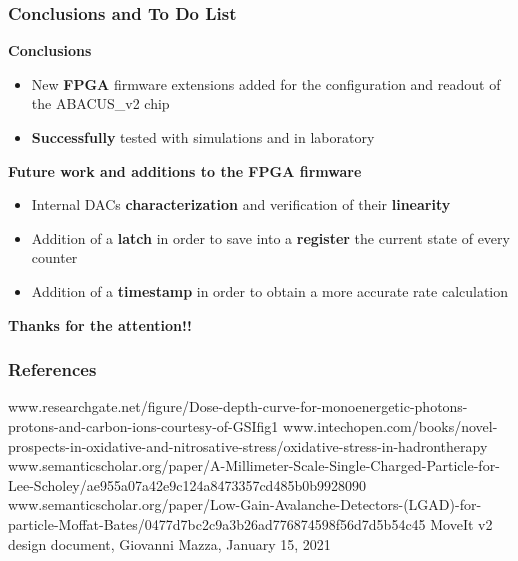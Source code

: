 \documentclass[aspectratio=169]{beamer}
\begin{document}
	\begin{frame}
	\frametitle{Conclusions and To Do List}
	\begin{center}
		{\color{blue}\textbf{Conclusions}}
	\end{center}
		\begin{itemize}
			\item New \textbf{FPGA} firmware extensions added for the configuration and readout of the ABACUS\_v2 chip
			\item \textbf{Successfully} tested with simulations and in laboratory
		\end{itemize}
	
	\begin{center}
		{\color{blue}\textbf{Future work and additions to the FPGA firmware}}
	\end{center}
		\begin{itemize}
			\item Internal DACs \textbf{characterization} and verification of their \textbf{linearity}
			\item Addition of a \textbf{latch} in order to save into a \textbf{register} the current state of every counter 
			\item Addition of a \textbf{timestamp} in order to obtain a more accurate rate calculation 
		\end{itemize}
			\vspace{1 cm}
		\begin{center}
			\textbf{Thanks for the attention!!}
		\end{center}	
	\end{frame}

	\begin{frame}[noframenumbering]
	\frametitle{References}
	{\scriptsize 
	\begin{thebibliography}{00}
		www.researchgate.net/figure/Dose-depth-curve-for-monoenergetic-photons-protons-and-carbon-ions-courtesy-of-GSI\textunderscore fig1\textunderscore283521369
		\newline
		www.intechopen.com/books/novel-prospects-in-oxidative-and-nitrosative-stress/oxidative-stress-in-hadrontherapy
		\newline
		www.semanticscholar.org/paper/A-Millimeter-Scale-Single-Charged-Particle-for-Lee-Scholey/ae955a07a42e9c124a8473357cd485b0b9928090
		\newline
		www.semanticscholar.org/paper/Low-Gain-Avalanche-Detectors-(LGAD)-for-particle-Moffat-Bates/0477d7bc2c9a3b26ad776874598f56d7d5b54c45
		\newline
		MoveIt v2 design document, Giovanni Mazza, January 15, 2021
	\end{thebibliography} }
	\end{frame}
\end{document}
